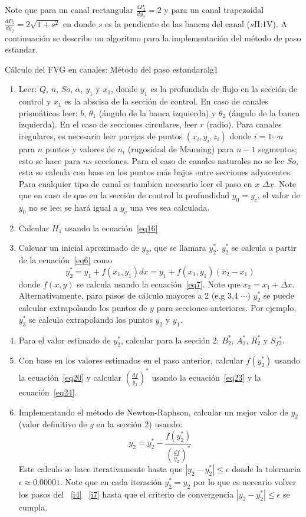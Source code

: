 \documentclass[11pt, oneside]{article}
\begin{document}
Note que para un canal rectangular $\frac{d P_2}{d y_2} = 2$ y para un canal trapezoidal $\frac{d P_2}{d y_2} = 2\sqrt{1+s^2}$ en donde $s$ es la pendiente de las bancas del canal ($s$H:1V).
A continuaci\'on se describe un algoritmo para la implementaci\'on del m\'etodo de paso estandar.
\begin{alg}{C\'alculo del FVG en canales: M\'etodo del paso estandar}{alg1}
\begin{enumerate}
\item Leer: $Q$, $n$, $So$, $\alpha$, $y_1$ y $x_1$, donde $y_1$ es la profundida de flujo en la secci\'on de control y $x_1$ es la abscisa de la secci\'on de control.  En caso de canales prism\'aticos leer: $b$, $\theta_1$ (\'angulo de la banca izquierda) y $\theta_2$ (\'angulo de la banca izquierda). En el caso de secciones circulares, leer $r$ (radio). Para canales iregulares, es necesario leer parejas de puntos $(x_i, y_i, z_i)$ donde $i=1\cdots n$ para $n$ puntos y valores de $n_i$ (rugosidad de Manning) para $n-1$ segmentos; esto se hace para $ns$ secciones. Para el caso de canales naturales no se lee $So$, esta se calcula con base en los puntos m\'as bajos entre secciones adyacentes. Para cualquier tipo de canal es tambien necesario leer el paso en $x$ $\Delta x$. Note que en caso de que en la secci\'on de control la profundidad $y_0 = y_c$, el valor de $y_0$ no se lee; se har\'a igual a $y_c$ una ves sea calculada.   
\item Calcular $H_1$ usando la ecuaci\'on~\ref{eq16}
\item Calcuar un inicial aproximado de $y_2$, que se llamara $y_2^*$. $y_2^*$ se calcula a partir de la ecuaci\'on~\ref{eq6} como
    $$
    y_2^* = y_1 + f(x_1,y_1)dx = y_1 + f(x_1,y_1)(x_2-x_1)
    $$
    donde $f(x,y)$ se calcula usando la ecuaci\'on~\ref{eq7}. Note que $x_2 = x_1+\Delta x$. Alternativamente, para pasos de c\'alculo mayores a 2 (e.g 3,4 $\cdots$) $y_2^*$ se puede calcular extrapolando los puntos de $y$ para secciones anteriores. Por ejemplo, $y_3^*$ se calcula extrapolando los puntos $y_2$ y $y_1$. 
\item \label{i4} Para el valor estimado de $y_2^*$, calcular para la secci\'on 2: $B_2^*$, $A_2^*$, $R_2^*$ y $S_f{_2^*}$.
\item Con base en los valores estimados en el paso anterior, calcular $f\left( y_2^* \right)$ usando la ecuaci\'on~\ref{eq20} y calcular $\left( \frac{df}{y_2} \right)^* $ usando la ecuaci\'on~\ref{eq23} y la ecuaci\'on~\ref{eq24}.
\item \label{i7} Implementando el m\'etodo de Newton-Raphson, calcular un mejor valor de $y_2$ (valor definitivo de $y$ en la secci\'on 2) usando:
    $$
    y_2 = y_2^* - \frac{f\left( y_2^* \right)}{\left( \frac{df}{y_2} \right)^*}
    $$
    Este calculo se hace iterativamente hasta que $\left| y_2 - y_2^* \right| \leq \epsilon$  donde la tolerancia $\epsilon \approx 0.00001$. Note que en cada iteraci\'on $y_2^* = y_2$ por lo que es neceario volver los pasos del ~\ref{i4} ~\ref{i7} hasta que el criterio de convergencia $\left| y_2 - y_2^* \right| \leq \epsilon$ se cumpla. 


\end{enumerate}
\end{alg}
\end{document}
